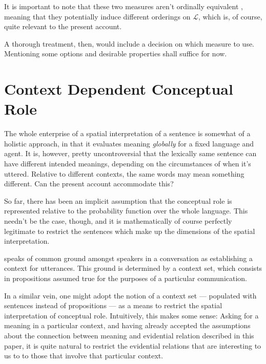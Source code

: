 \documentclass[11pt, a4paper]{scrartcl}
\renewcommand{\i}[1]{\emph{#1}}
\renewcommand{\L}{\mathcal{L}}
\begin{document}
It is important to note that these two measures aren't ordinally equivalent \parencite[364]{Fitelson1999-FITTPO-3}, meaning that they potentially induce different orderings on $\L$, which is, of course, quite relevant to the present account.

A thorough treatment, then, would include a decision on which measure to use. Mentioning some options and desirable properties shall suffice for now. 

\section{Context Dependent Conceptual Role}\label{sec:contexts}

The whole enterprise of a spatial interpretation of a sentence is somewhat of a holistic approach, in that it evaluates meaning \i{globally} for a fixed language and agent. It is, however, pretty uncontroversial that the lexically same sentence can have different intended meanings, depending on the circumstances of when it's uttered. Relative to different contexts, the same words may mean something different. Can the present account accommodate this? 

So far, there has been an implicit assumption that the conceptual role is represented relative to the probability function over the whole language. This needn't be the case, though, and it is mathematically of course perfectly legitimate to restrict the sentences which make up the dimensions of the spatial interpretation. 

\textcite{Stalnaker1978-STAA-2} speaks of common ground amongst speakers in a conversation as establishing a context for utterances. This ground is determined by a context set, which consists in propositions assumed true for the purposes of a particular communication.

In a similar vein, one might adopt the notion of a context set --- populated with sentences instead of propositions --- as a means to restrict the spatial interpretation of conceptual role. Intuitively, this makes some sense: Asking for a meaning in a particular context, and having already accepted the assumptions about the connection between meaning and evidential relation described in this paper, it is quite natural to restrict the evidential relations that are interesting to us to to those that involve that particular context.
\end{document}
